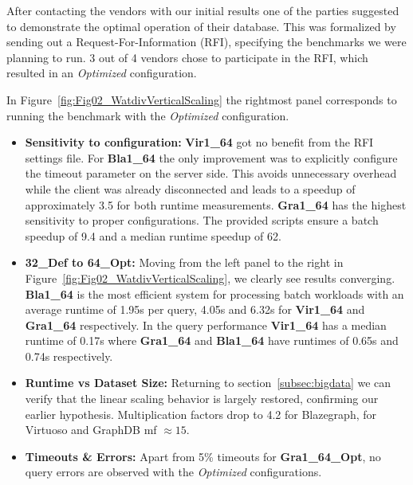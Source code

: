 %

After contacting the vendors with our initial results one of the parties suggested to demonstrate the optimal operation of their database. 
This was formalized by sending out a Request-For-Information (RFI), specifying the benchmarks we were planning to run.
3 out of 4 vendors chose to participate in the RFI, which resulted in an \emph{Optimized} configuration. 

In Figure~\ref{fig:Fig02_WatdivVerticalScaling} the rightmost panel corresponds to running the benchmark with the \emph{Optimized} configuration.

%
%
%
\begin{itemize}
	\item \textbf{Sensitivity to configuration:} \textbf{Vir1\_64} got no benefit from the RFI settings file. For 
	\textbf{Bla1\_64} the only improvement was to explicitly configure the timeout parameter on the server side. This avoids unnecessary overhead while the client was already disconnected and leads to a speedup of approximately 3.5 for both runtime measurements. \textbf{Gra1\_64} has the highest sensitivity to proper configurations. The provided scripts ensure a batch speedup of 9.4 and a median runtime speedup of 62.
	\item \textbf{32\_Def to 64\_Opt:} Moving from the left panel to the right in Figure~\ref{fig:Fig02_WatdivVerticalScaling}, we clearly see results converging. \textbf{Bla1\_64} is the most efficient system for processing batch workloads with an average runtime of 1.95s per query, 4.05s and 6.32s for \textbf{Vir1\_64} and \textbf{Gra1\_64} respectively. In the query performance \textbf{Vir1\_64} has a median runtime of 0.17s where \textbf{Gra1\_64} and \textbf{Bla1\_64} have runtimes of 0.65s and 0.74s respectively.
	\item \textbf{Runtime vs Dataset Size:} Returning to section~\ref{subsec:bigdata} we can verify that the linear scaling behavior is largely restored, confirming our earlier hypothesis. Multiplication factors drop to 4.2 for Blazegraph, for Virtuoso and GraphDB mf $ \approx 15$.
\item \textbf{Timeouts \& Errors:} Apart from 5\% timeouts for \textbf{Gra1\_64\_Opt}, no query errors are observed with the \emph{Optimized} configurations.
\end{itemize}

